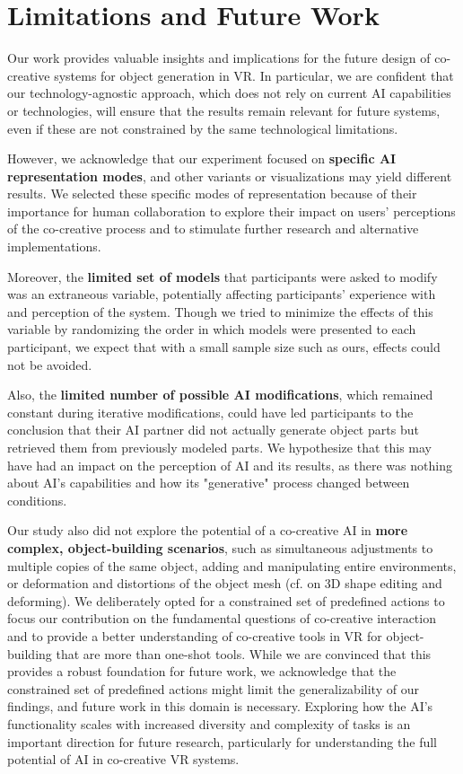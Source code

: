 \section{Limitations and Future Work}
Our work provides valuable insights and implications for the future design of co-creative systems for object generation in VR. 
In particular, we are confident that our technology-agnostic approach, which does not rely on current AI capabilities or technologies, will ensure that the results remain relevant for future systems, even if these are not constrained by the same technological limitations. %

However, we acknowledge that our experiment focused on \textbf{specific AI representation modes}, and other variants or visualizations may yield different results. 
We selected these specific modes of representation because of their importance for human collaboration to explore their impact on users' perceptions of the co-creative process and to stimulate further research and alternative implementations. 


Moreover, the \textbf{limited set of models} that participants were asked to modify was an extraneous variable, potentially affecting participants' experience with and perception of the system. Though we tried to minimize the effects of this variable by randomizing the order in which models were presented to each participant, we expect that with a small sample size such as ours, effects could not be avoided.

Also, the \textbf{limited number of possible AI modifications}, which remained constant during iterative modifications, could have led participants to the conclusion that their AI partner did not actually generate object parts but retrieved them from previously modeled parts. We hypothesize that this may have had an impact on the perception of AI and its results, as there was nothing about AI's capabilities and how its "generative" process changed between conditions.

Our study also did not explore the potential of a co-creative AI in \textbf{more complex, object-building scenarios}, such as simultaneous adjustments to multiple copies of the same object, adding and manipulating entire environments, or deformation and distortions of the object mesh (cf. \cite{Slim2024,Achlioptas2023,Angelis2024} on 3D shape editing and deforming).
We deliberately opted for a constrained set of predefined actions to focus our contribution on the fundamental questions of co-creative interaction and to provide a better understanding of co-creative tools in VR for object-building that are more than one-shot tools. While we are convinced that this provides a robust foundation for future work, we acknowledge that the constrained set of predefined actions might limit the generalizability of our findings, and future work in this domain is necessary.
Exploring how the AI's functionality scales with increased diversity and complexity of tasks is an important direction for future research, particularly for understanding the full potential of AI in co-creative VR systems.

